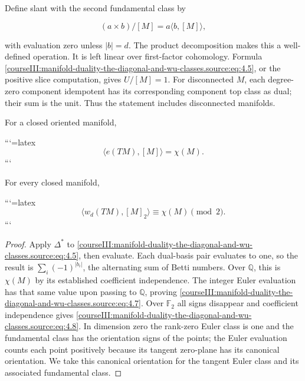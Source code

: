 Define slant with the second fundamental class by

\begin{equation}
(a\times b)/[M]=a\langle b,[M]\rangle,
\label{courseIII:manifold-duality-the-diagonal-and-wu-classes.source:eq:4.6}
\end{equation}

with evaluation zero unless \(|b|=d\). The product decomposition makes this a well-defined operation. It is left linear over first-factor cohomology. Formula \eqref{courseIII:manifold-duality-the-diagonal-and-wu-classes.source:eq:4.5}, or the positive slice computation, gives \(U/[M]=1\). For disconnected \(M\), each degree-zero component idempotent has its corresponding component top class as dual; their sum is the unit. Thus the statement includes disconnected manifolds.

\label{courseIII:duality:4.2}

\begin{corollary}
For a closed oriented manifold,


```{=latex}
\begin{equation}
\langle e(TM),[M]\rangle=\chi(M).
\label{courseIII:manifold-duality-the-diagonal-and-wu-classes.source:eq:4.7}
\end{equation}
```


For every closed manifold,


```{=latex}
\begin{equation}
\langle w_d(TM),[M]_2\rangle\equiv\chi(M)\pmod2.
\label{courseIII:manifold-duality-the-diagonal-and-wu-classes.source:eq:4.8}
\end{equation}
```


\end{corollary}
\begin{proof}
Apply \(\Delta^*\) to \eqref{courseIII:manifold-duality-the-diagonal-and-wu-classes.source:eq:4.5}, then evaluate. Each dual-basis pair evaluates to one, so the result is \(\sum_i(-1)^{|b_i|}\), the alternating sum of Betti numbers. Over \(\mathbb Q\), this is \(\chi(M)\) by its established coefficient independence. The integer Euler evaluation has that same value upon passing to \(\mathbb Q\), proving \eqref{courseIII:manifold-duality-the-diagonal-and-wu-classes.source:eq:4.7}. Over \(\mathbb F _2\) all signs disappear and coefficient independence gives \eqref{courseIII:manifold-duality-the-diagonal-and-wu-classes.source:eq:4.8}. In dimension zero the rank-zero Euler class is one and the fundamental class has the orientation signs of the points; the Euler evaluation counts each point positively because its tangent zero-plane has its canonical orientation. We take this canonical orientation for the tangent Euler class and its associated fundamental class.
\end{proof}
